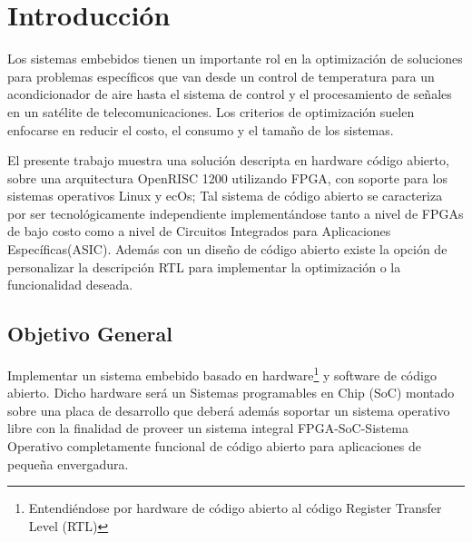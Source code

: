 \documentclass[conference]{IEEEtran}
\begin{document}




%
\IEEEpeerreviewmaketitle



\section{Introducción} \label{sec:intro}
Los sistemas embebidos tienen un importante rol en la optimización de soluciones para problemas específicos que van desde un control de temperatura para un acondicionador de aire hasta el sistema de control y el procesamiento de señales en un satélite de
telecomunicaciones. Los criterios de optimización suelen enfocarse en reducir el costo, el consumo y el tamaño de los sistemas.

El presente trabajo muestra una solución descripta en hardware código abierto, sobre una arquitectura OpenRISC 1200 utilizando FPGA, con soporte para los sistemas operativos Linux y ecOs; Tal sistema de código abierto se caracteriza por ser tecnológicamente independiente implementándose tanto a nivel de FPGAs de bajo costo como a nivel de Circuitos Integrados para Aplicaciones Específicas(ASIC). Además con un diseño de código abierto existe la opción de personalizar la descripción RTL
para implementar la optimización o la funcionalidad deseada.


\subsection{Objetivo General}%

Implementar un sistema embebido basado en hardware\footnote{Entendiéndose por hardware de código abierto al código Register Transfer Level (RTL)} y software de código abierto.
Dicho hardware será un Sistemas programables en Chip (SoC) montado sobre una placa de desarrollo que deberá además soportar un sistema operativo
libre con la finalidad de proveer un sistema integral FPGA-SoC-Sistema
Operativo completamente funcional de código abierto para aplicaciones de pequeña envergadura.
\end{document}
